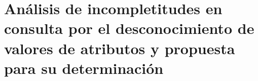 \chapter{Análisis de incompletitudes en consulta por el desconocimiento de valores de atributos y propuesta para su determinación} \label{chap:analisisFuenteIncompletitud}
